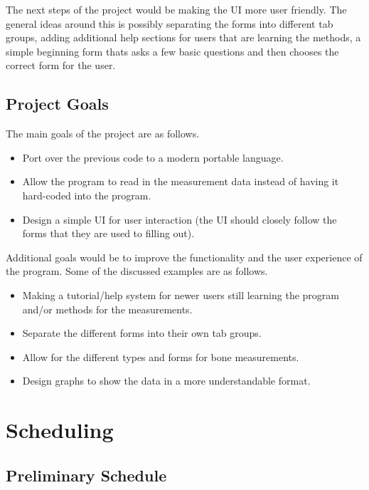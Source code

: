 \documentclass[12pt,letterpaper]{article}
\begin{document}
The next steps of the project would be making the UI more user friendly. The general ideas around this is possibly separating the forms into different tab groups, adding additional help sections for users that are learning the methods, a simple beginning form thats asks a few basic questions and then chooses the correct form for the user.

\subsection{Project Goals}

The main goals of the project are as follows.

\begin{itemize}

\item Port over the previous code to a modern portable language.
\item Allow the program to read in the measurement data instead of having it hard-coded into the program.
\item Design a simple UI for user interaction (the UI should closely follow the forms that they are used to filling out).

\end{itemize}

Additional goals would be to improve the functionality and the user experience of the program. Some of the discussed examples are as follows.

\begin{itemize}

\item Making a tutorial/help system for newer users still learning the program and/or methods for the measurements.
\item Separate the different forms into their own tab groups.
\item Allow for the different types and forms for bone measurements.
\item Design graphs to show the data in a more understandable format.
\end{itemize}

\section{Scheduling}

\subsection{Preliminary Schedule}
\end{document}
